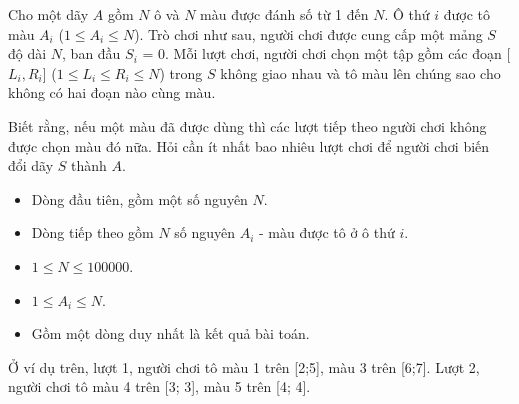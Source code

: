 \documentclass[12pt,a4paper,oneside]{article}
\begin{document}

\renewcommand{\baselinestretch}{1.25}
\setlength{\parskip}{1em}

Cho một dãy $A$ gồm $N$ ô và $N$ màu được đánh số từ 1 đến $N$. Ô thứ $i$ được tô màu $A_i$ ($1 \leq A_i \leq N$). Trò chơi như sau, người chơi được cung cấp một mảng $S$ độ dài $N$, ban đầu $S_i$ = 0. Mỗi lượt chơi, người chơi chọn một tập gồm các đoạn [$L_i, R_i$] ($1 \leq L_i \leq R_i \leq N$) trong $S$ không giao nhau và tô màu lên chúng sao cho không có hai đoạn nào cùng màu. 

Biết rằng, nếu một màu đã được dùng thì các lượt tiếp theo người chơi không được chọn màu đó nữa. Hỏi cần ít nhất bao nhiêu lượt chơi để người chơi biến đổi dãy $S$ thành $A$.

\renewcommand{\baselinestretch}{1.0}
\setlength{\parskip}{0.25em}


\begin{itemize}
    \item Dòng đầu tiên, gồm một số nguyên $N$.
    \item Dòng tiếp theo gồm $N$ số nguyên $A_i$ - màu được tô ở ô thứ $i$.
\end{itemize}

\begin{itemize}
    \item $1 \leq N \leq 100000$.
    \item $1 \leq A_i \leq N$.
\end{itemize}


\begin{itemize}
\item Gồm một dòng duy nhất là kết quả bài toán.
\end{itemize}


\begin{example}
\end{example}

Ở ví dụ trên, lượt 1, người chơi tô màu 1 trên [2;5], màu 3 trên [6;7]. Lượt 2, người chơi tô màu 4 trên [3; 3], màu 5 trên [4; 4].
\end{document}
